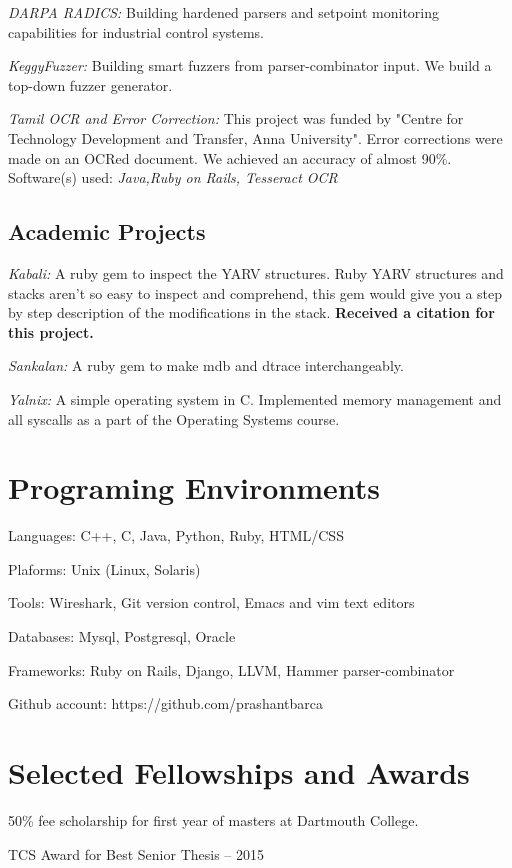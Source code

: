 \documentclass[letterpaper,10pt]{article}
\renewenvironment{itemize}{
  \begin{list}{}{
    \setlength{\leftmargin}{1.5em}
  }
}{
  \end{list}
}
\begin{document}
\begin{itemize}
\setlength\itemsep{0ex}

\item \textit{DARPA RADICS:} Building hardened parsers and setpoint monitoring capabilities for industrial control systems.

\item \textit{KeggyFuzzer:} Building smart fuzzers from parser-combinator input. We build a top-down fuzzer generator.

\item \textit{Tamil OCR and Error Correction:} This project was funded by "Centre for Technology Development and Transfer, Anna University". Error corrections were made on an OCRed document. We achieved an accuracy of almost 90\%. Software(s) used: \textsl{Java,Ruby on Rails, Tesseract OCR}

\end{itemize}


\subsection*{Academic Projects}
\begin{itemize}
  \setlength\itemsep{0ex}
  \item \textit{Kabali:} A ruby gem to inspect the YARV structures. Ruby YARV structures and stacks aren't so easy to inspect and comprehend, this gem would give you a step by step description of the modifications in the stack. {\bf Received a citation for this project.}
  \item \textit{Sankalan:} A ruby gem to make mdb and dtrace interchangeably.
  \item \textit{Yalnix:} A simple operating system in C. Implemented memory management and all syscalls as a part of the Operating Systems course.

  \end{itemize}


\section*{Programing Environments}
\setlength\itemsep{0ex}
\begin {itemize}
\setlength\itemsep{0ex}
\item Languages: C++, C, Java, Python, Ruby, HTML/CSS
\item Plaforms: Unix (Linux, Solaris)
\item Tools: Wireshark, Git version control, Emacs and vim text editors
\item Databases: Mysql, Postgresql, Oracle
\item Frameworks: Ruby on Rails, Django, LLVM, Hammer parser-combinator
\item Github account: https://github.com/prashantbarca
\end{itemize}

\section*{Selected Fellowships and Awards}
\setlength\itemsep{0ex}
\begin {itemize}
\setlength\itemsep{0ex}
\item 50\% fee scholarship for first year of masters at Dartmouth College. 
\item TCS Award for Best Senior Thesis -- 2015
\end{itemize}
\end{document}
